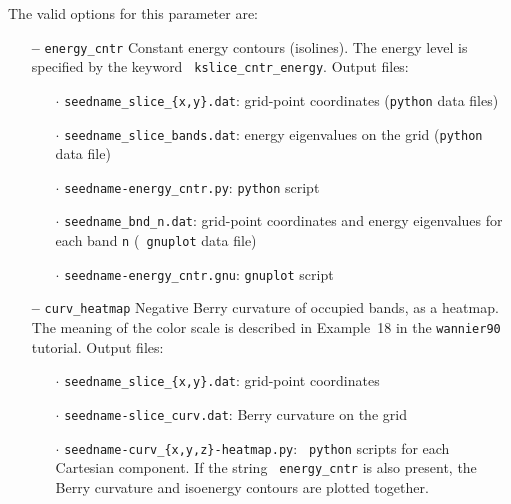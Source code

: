 The valid options for this parameter are:
\begin{itemize}

\item[{\bf --}] \verb#energy_cntr# Constant energy contours
  (isolines). The energy level is specified by the keyword {\tt
    kslice\_cntr\_energy}. Output files:

  \begin{itemize}

  \item[$\cdot$] {\tt seedname\_slice\_\{x,y\}.dat}: grid-point
    coordinates ({\tt python} data files)

  \item[$\cdot$] {\tt seedname\_slice\_bands.dat}: energy eigenvalues
    on the grid ({\tt python} data file)

  \item[$\cdot$] {\tt seedname-energy\_cntr.py}: {\tt python} script

  \item[$\cdot$] {\tt seedname\_bnd\_n.dat}: grid-point coordinates
    and energy eigenvalues for each band {\tt n} ({\tt
      gnuplot} data file)

  \item[$\cdot$] {\tt seedname-energy\_cntr.gnu}: {\tt gnuplot} script

  \end{itemize}

\item[{\bf --}] \verb#curv_heatmap# Negative Berry curvature of occupied bands,
  as a heatmap. The meaning of the color scale is described in
  Example~18 in the {\tt wannier90} tutorial. Output files:

  \begin{itemize}

  \item[$\cdot$] {\tt seedname\_slice\_\{x,y\}.dat}: grid-point coordinates 
    
  \item[$\cdot$] {\tt seedname-slice\_curv.dat}: Berry curvature 
    on the grid
    
  \item[$\cdot$] {\tt seedname-curv\_\{x,y,z\}-heatmap.py}: {\tt
      python} scripts for each Cartesian component. If the string {\tt
      energy\_cntr} is also present, the Berry curvature and isoenergy
    contours are plotted together.
    
  \end{itemize}


\end{itemize}
